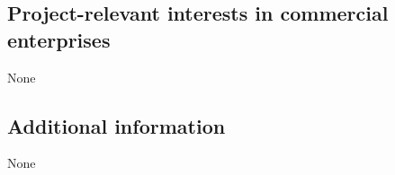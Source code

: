 \documentclass[10pt,fleqn,twoside,a4paper]{article}
\begin{document}
\subsection{Project-relevant interests in commercial enterprises}

None


\subsection{Additional information}

None

\newpage

\mbox{}
\end{document}
